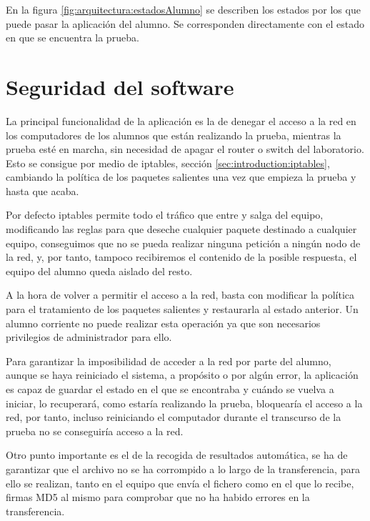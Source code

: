 En la figura \ref{fig:arquitectura:estadosAlumno} se describen los estados por los que puede pasar la aplicación del alumno. Se corresponden directamente con el estado en que se encuentra la prueba.


\section{Seguridad del software}
\label{sec:arquitectura:seguro}

La principal funcionalidad de la aplicación es la de denegar el acceso a la red en los computadores de los alumnos que están realizando la prueba, mientras la prueba esté en marcha, sin necesidad de apagar el router o switch del laboratorio. Esto se consigue por medio de iptables, sección \ref{sec:introduction:iptables}, cambiando la política de los paquetes salientes una vez que empieza la prueba y hasta que acaba.
\newline

Por defecto iptables permite todo el tráfico que entre y salga del equipo, modificando las reglas para que deseche cualquier paquete destinado a cualquier equipo, conseguimos que no se pueda realizar ninguna petición a ningún nodo de la red, y, por tanto, tampoco recibiremos el contenido de la posible respuesta, el equipo del alumno queda aislado del resto.
\newline

A la hora de volver a permitir el acceso a la red, basta con modificar la política para el tratamiento de los paquetes salientes y restaurarla al estado anterior. Un alumno corriente no puede realizar esta operación ya que son necesarios privilegios de administrador para ello.
\newline

Para garantizar la imposibilidad de acceder a la red por parte del alumno, aunque se haya reiniciado el sistema, a propósito o por algún error, la aplicación es capaz de guardar el estado en el que se encontraba y cuándo se vuelva a iniciar, lo recuperará, como estaría realizando la prueba, bloquearía el acceso a la red, por tanto, incluso reiniciando el computador durante el transcurso de la prueba no se conseguiría acceso a la red.
\newline


Otro punto importante es el de la recogida de resultados automática, se ha de garantizar que el archivo no se ha corrompido a lo largo de la transferencia, para ello se realizan, tanto en el equipo que envía el fichero como en el que lo recibe, firmas MD5 al mismo para comprobar que no ha habido errores en la transferencia.


